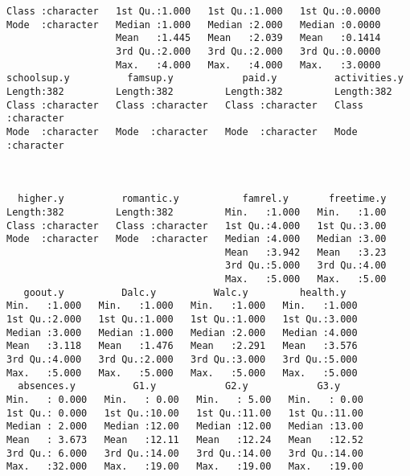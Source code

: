 \documentclass[12pt]{abntex2}
\begin{document}
\begin{verbatim}
Class :character   1st Qu.:1.000   1st Qu.:1.000   1st Qu.:0.0000  
Mode  :character   Median :1.000   Median :2.000   Median :0.0000  
                   Mean   :1.445   Mean   :2.039   Mean   :0.1414  
                   3rd Qu.:2.000   3rd Qu.:2.000   3rd Qu.:0.0000  
                   Max.   :4.000   Max.   :4.000   Max.   :3.0000  
schoolsup.y          famsup.y            paid.y          activities.y      
Length:382         Length:382         Length:382         Length:382        
Class :character   Class :character   Class :character   Class :character  
Mode  :character   Mode  :character   Mode  :character   Mode  :character  



  higher.y          romantic.y           famrel.y       freetime.y  
Length:382         Length:382         Min.   :1.000   Min.   :1.00  
Class :character   Class :character   1st Qu.:4.000   1st Qu.:3.00  
Mode  :character   Mode  :character   Median :4.000   Median :3.00  
                                      Mean   :3.942   Mean   :3.23  
                                      3rd Qu.:5.000   3rd Qu.:4.00  
                                      Max.   :5.000   Max.   :5.00  
   goout.y          Dalc.y          Walc.y         health.y    
Min.   :1.000   Min.   :1.000   Min.   :1.000   Min.   :1.000  
1st Qu.:2.000   1st Qu.:1.000   1st Qu.:1.000   1st Qu.:3.000  
Median :3.000   Median :1.000   Median :2.000   Median :4.000  
Mean   :3.118   Mean   :1.476   Mean   :2.291   Mean   :3.576  
3rd Qu.:4.000   3rd Qu.:2.000   3rd Qu.:3.000   3rd Qu.:5.000  
Max.   :5.000   Max.   :5.000   Max.   :5.000   Max.   :5.000  
  absences.y          G1.y            G2.y            G3.y      
Min.   : 0.000   Min.   : 0.00   Min.   : 5.00   Min.   : 0.00  
1st Qu.: 0.000   1st Qu.:10.00   1st Qu.:11.00   1st Qu.:11.00  
Median : 2.000   Median :12.00   Median :12.00   Median :13.00  
Mean   : 3.673   Mean   :12.11   Mean   :12.24   Mean   :12.52  
3rd Qu.: 6.000   3rd Qu.:14.00   3rd Qu.:14.00   3rd Qu.:14.00  
Max.   :32.000   Max.   :19.00   Max.   :19.00   Max.   :19.00  
\end{verbatim}
\end{document}

